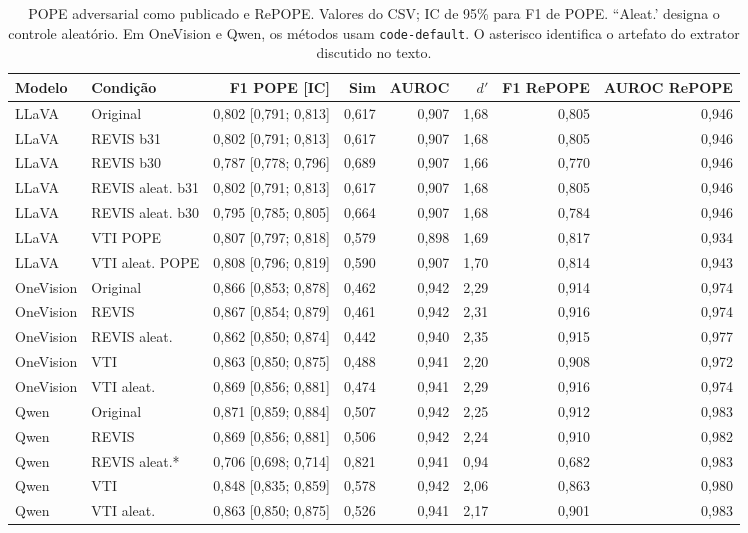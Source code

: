 \begin{table}[t]
\centering\small
\caption{POPE adversarial como publicado e RePOPE. Valores do CSV; IC de 95\% para F1 de POPE. ``Aleat.' designa o controle aleatório. Em OneVision e Qwen, os métodos usam \texttt{code-default}. O asterisco identifica o artefato do extrator discutido no texto.}
\label{tab:pope}
\begin{tabular}{llrrrrrr}
\toprule Modelo & Condição & F1 POPE [IC] & Sim & AUROC & $d'$ & F1 RePOPE & AUROC RePOPE \\ \midrule
LLaVA & Original & 0,802 [0,791; 0,813] & 0,617 & 0,907 & 1,68 & 0,805 & 0,946 \\
LLaVA & REVIS b31 & 0,802 [0,791; 0,813] & 0,617 & 0,907 & 1,68 & 0,805 & 0,946 \\
LLaVA & REVIS b30 & 0,787 [0,778; 0,796] & 0,689 & 0,907 & 1,66 & 0,770 & 0,946 \\
LLaVA & REVIS aleat. b31 & 0,802 [0,791; 0,813] & 0,617 & 0,907 & 1,68 & 0,805 & 0,946 \\
LLaVA & REVIS aleat. b30 & 0,795 [0,785; 0,805] & 0,664 & 0,907 & 1,68 & 0,784 & 0,946 \\
LLaVA & VTI POPE & 0,807 [0,797; 0,818] & 0,579 & 0,898 & 1,69 & 0,817 & 0,934 \\
LLaVA & VTI aleat. POPE & 0,808 [0,796; 0,819] & 0,590 & 0,907 & 1,70 & 0,814 & 0,943 \\
\midrule
OneVision & Original & 0,866 [0,853; 0,878] & 0,462 & 0,942 & 2,29 & 0,914 & 0,974 \\
OneVision & REVIS & 0,867 [0,854; 0,879] & 0,461 & 0,942 & 2,31 & 0,916 & 0,974 \\
OneVision & REVIS aleat. & 0,862 [0,850; 0,874] & 0,442 & 0,940 & 2,35 & 0,915 & 0,977 \\
OneVision & VTI & 0,863 [0,850; 0,875] & 0,488 & 0,941 & 2,20 & 0,908 & 0,972 \\
OneVision & VTI aleat. & 0,869 [0,856; 0,881] & 0,474 & 0,941 & 2,29 & 0,916 & 0,974 \\
\midrule
Qwen & Original & 0,871 [0,859; 0,884] & 0,507 & 0,942 & 2,25 & 0,912 & 0,983 \\
Qwen & REVIS & 0,869 [0,856; 0,881] & 0,506 & 0,942 & 2,24 & 0,910 & 0,982 \\
Qwen & REVIS aleat.* & 0,706 [0,698; 0,714] & 0,821 & 0,941 & 0,94 & 0,682 & 0,983 \\
Qwen & VTI & 0,848 [0,835; 0,859] & 0,578 & 0,942 & 2,06 & 0,863 & 0,980 \\
Qwen & VTI aleat. & 0,863 [0,850; 0,875] & 0,526 & 0,941 & 2,17 & 0,901 & 0,983 \\
\bottomrule\end{tabular}\end{table}
